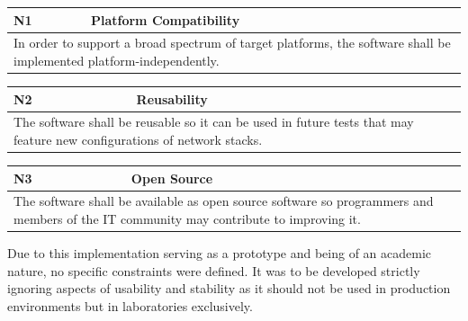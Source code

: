 \begin{center}
    \begin{tabular}{|p{1cm}|p{12cm}|}
        \hline
        \textbf{N1} & \textbf{Platform Compatibility}                                                                                                   \\ \hline
        \multicolumn{2}{|p{12cm}|}{In order to support a broad spectrum of target platforms, the software shall be implemented platform-independently.} \\ \hline
    \end{tabular}
\end{center}
\begin{center}
    \begin{tabular}{|p{1cm}|p{12cm}|}
        \hline
        \textbf{N2} & \textbf{Reusability}                                                                                                                  \\ \hline
        \multicolumn{2}{|p{12cm}|}{The software shall be reusable so it can be used in future tests that may feature new configurations of network stacks.} \\ \hline
    \end{tabular}
\end{center}
\begin{center}
    \begin{tabular}{|p{1cm}|p{12cm}|}
        \hline
        \textbf{N3} & \textbf{Open Source}                                                                                                                                 \\ \hline
        \multicolumn{2}{|p{12cm}|}{The software shall be available as open source software so programmers and members of the IT community may contribute to improving it.} \\ \hline
    \end{tabular}
\end{center}

Due to this implementation serving as a prototype and being of an academic nature, no specific constraints were defined. It was to be developed strictly ignoring aspects of usability and stability as it should not be used in production environments but in laboratories exclusively.

